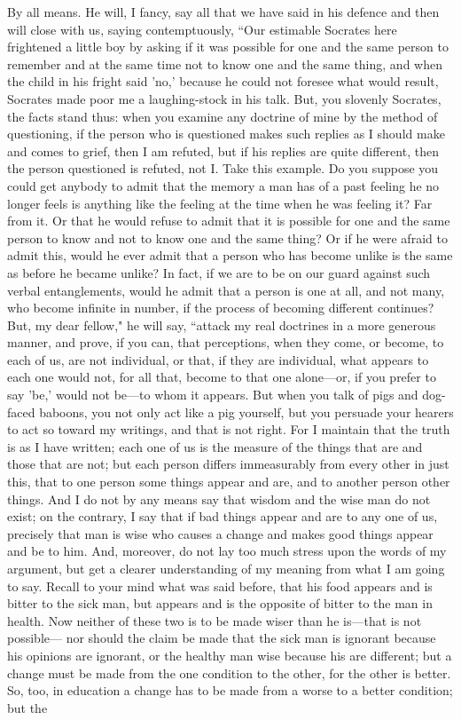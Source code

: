 \documentclass[letterpaper,12pt]{article}
\newcommand{\stephpag}[1]{\marginnote{\small\itshape\fontfamily{ppl}\selectfont #1}}
\begin{document}
\begin{drama}
\theaetetusspeaks
By all means.
\socratesspeaks
He will, I fancy, say all that we have said in his defence \stephpag{166 a} and then will close with us, saying contemptuously, ``Our estimable Socrates here frightened a little boy by asking if it was possible for one and the same person to remember and at the same time not to know one and the same thing, and when the child in his fright said 'no,' because he could not foresee what would result, Socrates made poor me a laughing-stock in his talk. But, you slovenly Socrates, the facts stand thus: when you examine any doctrine of mine by the method of questioning, if the person who is questioned makes such replies as I should make and comes to grief, then I am refuted, \stephpag{b} but if his replies are quite different, then the person questioned is refuted, not I. Take this example. Do you suppose you could get anybody to admit that the memory a man has of a past feeling he no longer feels is anything like the feeling at the time when he was feeling it? Far from it. Or that he would refuse to admit that it is possible for one and the same person to know and not to know one and the same thing? Or if he were afraid to admit this, would he ever admit that a person who has become unlike is the same as before he became unlike? In fact, if we are to be on our guard against such verbal entanglements, would he admit that a person is one at all, and not many, who become infinite in number, \stephpag{c} if the process of becoming different continues? But, my dear fellow," he will say, ``attack my real doctrines in a more generous manner, and prove, if you can, that perceptions, when they come, or become, to each of us, are not individual, or that, if they are individual, what appears to each one would not, for all that, become to that one alone—or, if you prefer to say 'be,' would not be—to whom it appears. But when you talk of pigs and dog-faced baboons, you not only act like a pig yourself, but you persuade your hearers to act so toward my writings, \stephpag{d} and that is not right. For I maintain that the truth is as I have written; each one of us is the measure of the things that are and those that are not; but each person differs immeasurably from every other in just this, that to one person some things appear and are, and to another person other things. And I do not by any means say that wisdom and the wise man do not exist; on the contrary, I say that if bad things appear and are to any one of us, precisely that man is wise who causes a change and makes good things appear and be to him. \stephpag{e} And, moreover, do not lay too much stress upon the words of my argument, but get a clearer understanding of my meaning from what I am going to say. Recall to your mind what was said before, that his food appears and is bitter to the sick man, but appears and is the opposite of bitter to the man in health. Now neither of these two is to be made wiser than he is—that is not possible— \stephpag{167 a} nor should the claim be made that the sick man is ignorant because his opinions are ignorant, or the healthy man wise because his are different; but a change must be made from the one condition to the other, for the other is better. So, too, in education a change has to be made from a worse to a better condition; but the 
\end{drama}
\end{document}
